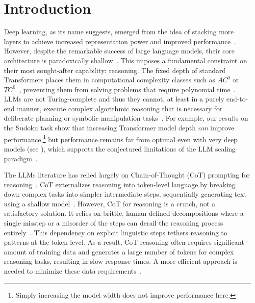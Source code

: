 \section{Introduction}

Deep learning, as its name suggests, emerged from the idea of stacking more layers to achieve increased representation power and improved performance~\cite{Goodfellow-et-al-2016, He2015DeepRL}. However, despite the remarkable success of large language models, their core architecture is paradoxically shallow~\cite{strobl-2023}. This imposes a fundamental constraint on their most sought-after capability: reasoning. The fixed depth of standard Transformers places them in computational complexity classes such as $AC^0$ or $TC^0$~\cite{10.5555/1631171.1631212}, preventing them from solving problems that require polynomial time~\cite{MS-2023, Chiang-2025}. LLMs are not Turing-complete and thus they cannot, at least in a purely end-to-end manner, execute complex algorithmic reasoning that is necessary for deliberate planning or symbolic manipulation tasks~\cite{Lehnert2024BeyondAB, Bounsi2024TransformersMN}. For example, our results on the Sudoku task show that increasing Transformer model depth {\it can} improve performance,\footnote{Simply increasing the model width does not improve performance here.} but performance remains far from optimal even with very deep models (see ), which supports the conjectured limitations of the LLM scaling paradigm~\citep{merrill-sabharwal-2023-parallelism}.

The LLMs literature has relied largely on Chain-of-Thought (CoT) prompting for reasoning~\cite{ChainOfThought2022}. CoT externalizes reasoning into token-level language by breaking down complex tasks into simpler intermediate steps, sequentially generating text using a shallow model~\cite{MS-2024}. However, CoT for reasoning is a crutch, not a satisfactory solution. It relies on brittle, human-defined decompositions where a single misstep or a misorder of the steps can derail the reasoning process entirely~\cite{Chen2024PremiseOM, Xu2024PreemptiveA}. This dependency on explicit linguistic steps tethers reasoning to 
patterns at the token level. As a result, CoT reasoning often requires significant amount of training data and generates a large number of tokens for complex reasoning tasks, resulting in slow response times. A more efficient approach is needed to minimize these data requirements~\cite{Villalobos2022WillWR}.


